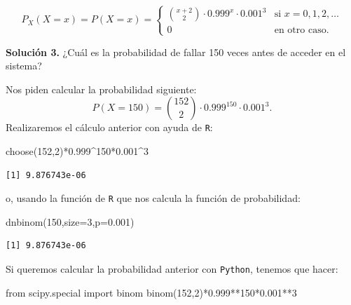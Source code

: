 \documentclass[
  letterpaper,
  DIV=11,
  numbers=noendperiod]{scrreprt}
\newenvironment{Shaded}{\begin{snugshade}}{\end{snugshade}}
\newcommand{\AttributeTok}[1]{\textcolor[rgb]{0.40,0.45,0.13}{#1}}
\newcommand{\DecValTok}[1]{\textcolor[rgb]{0.68,0.00,0.00}{#1}}
\newcommand{\FloatTok}[1]{\textcolor[rgb]{0.68,0.00,0.00}{#1}}
\newcommand{\FunctionTok}[1]{\textcolor[rgb]{0.28,0.35,0.67}{#1}}
\newcommand{\ImportTok}[1]{\textcolor[rgb]{0.00,0.46,0.62}{#1}}
\newcommand{\NormalTok}[1]{\textcolor[rgb]{0.00,0.23,0.31}{#1}}
\newcommand{\OperatorTok}[1]{\textcolor[rgb]{0.37,0.37,0.37}{#1}}
\newcommand{\SpecialCharTok}[1]{\textcolor[rgb]{0.37,0.37,0.37}{#1}}
\begin{document}
\[
P_X(X=x)=P(X=x)=
\left\{
\begin{array}{cc} 
{x+2\choose 2} \cdot 0.999^{x}\cdot 0.001^3 & \mbox{si }  x=0,1,2,\ldots \\ 0 & \mbox{en otro caso.}\end{array}\right.
\]

\textbf{Solución 3.} ¿Cuál es la probabilidad de fallar 150 veces antes
de acceder en el sistema?

Nos piden calcular la probabilidad siguiente: \[
P(X=150)= {152\choose 2} \cdot 0.999^{150}\cdot 0.001^3.
\] Realizaremos el cálculo anterior con ayuda de \texttt{R}:

\begin{Shaded}
\begin{Highlighting}[]
\FunctionTok{choose}\NormalTok{(}\DecValTok{152}\NormalTok{,}\DecValTok{2}\NormalTok{)}\SpecialCharTok{*}\FloatTok{0.999}\SpecialCharTok{\^{}}\DecValTok{150}\SpecialCharTok{*}\FloatTok{0.001}\SpecialCharTok{\^{}}\DecValTok{3}
\end{Highlighting}
\end{Shaded}

\begin{verbatim}
[1] 9.876743e-06
\end{verbatim}

o, usando la función de \texttt{R} que nos calcula la función de
probabilidad:

\begin{Shaded}
\begin{Highlighting}[]
\FunctionTok{dnbinom}\NormalTok{(}\DecValTok{150}\NormalTok{,}\AttributeTok{size=}\DecValTok{3}\NormalTok{,}\AttributeTok{p=}\FloatTok{0.001}\NormalTok{)}
\end{Highlighting}
\end{Shaded}

\begin{verbatim}
[1] 9.876743e-06
\end{verbatim}

Si queremos calcular la probabilidad anterior con \texttt{Python},
tenemos que hacer:

\begin{Shaded}
\begin{Highlighting}[]
\ImportTok{from}\NormalTok{  scipy.special }\ImportTok{import}\NormalTok{ binom}
\NormalTok{binom(}\DecValTok{152}\NormalTok{,}\DecValTok{2}\NormalTok{)}\OperatorTok{*}\FloatTok{0.999}\OperatorTok{**}\DecValTok{150}\OperatorTok{*}\FloatTok{0.001}\OperatorTok{**}\DecValTok{3}
\end{Highlighting}
\end{Shaded}
\end{document}
